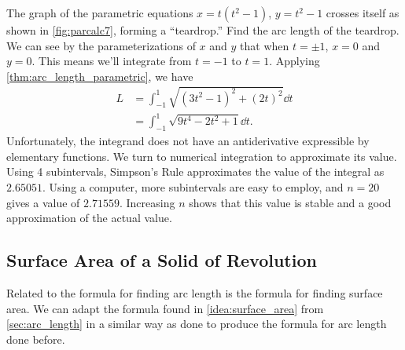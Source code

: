 
\begin{example}\label{ex_parcalc7}%
The graph of the parametric equations $x=t(t^2-1)$, $y=t^2-1$ crosses itself as shown in \autoref{fig:parcalc7}, forming a ``teardrop.'' Find the arc length of the teardrop.
\solution
We can see by the parameterizations of $x$ and $y$ that when $t=\pm 1$, $x=0$ and $y=0$. This means we'll integrate from $t=-1$ to $t=1$. Applying \autoref{thm:arc_length_parametric}, we have
\begin{align*}
L 	&= \int_{-1}^1\sqrt{(3t^2-1)^2+(2t)^2}\dd t\\
		&=	\int_{-1}^1 \sqrt{9t^4-2t^2+1} \dd t.
\end{align*}
Unfortunately, the integrand does not have an antiderivative expressible by elementary functions. We turn to numerical integration to approximate its value. Using 4 subintervals, Simpson's Rule approximates the value of the integral as $2.65051$. Using a computer, more subintervals are easy to employ, and $n=20$ gives a value of $2.71559$. Increasing $n$ shows that this value is stable and a good approximation of the actual value.
\end{example}


\subsection{Surface Area of a Solid of Revolution}

Related to the formula for finding arc length is the formula for finding surface area. We can adapt the formula found in \autoref{idea:surface_area} from \autoref{sec:arc_length} in a similar way as done to produce the formula for arc length done before.

